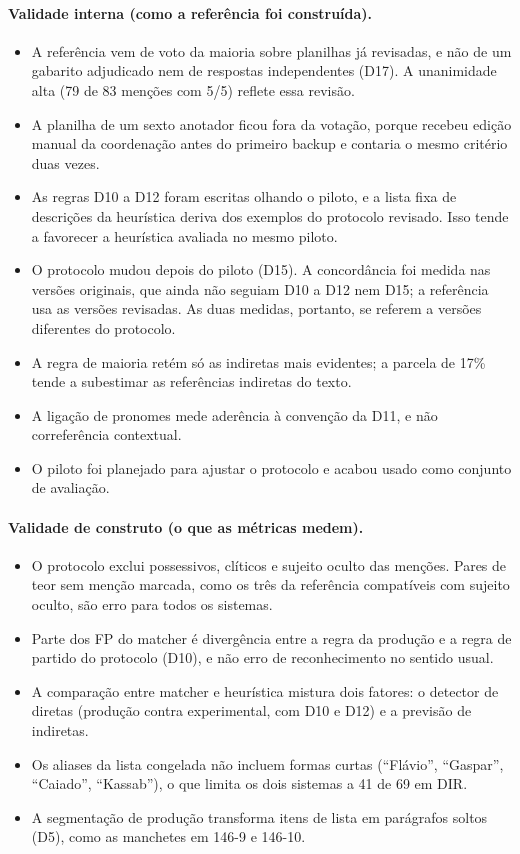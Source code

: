 \documentclass[11pt,a4paper]{article}
\begin{document}
\paragraph{Validade interna (como a referência foi construída).}
\begin{itemize}
\item A referência vem de voto da maioria sobre planilhas já revisadas, e não de um gabarito adjudicado nem de respostas independentes (D17). A unanimidade alta (79 de 83 menções com 5/5) reflete essa revisão.
\item A planilha de um sexto anotador ficou fora da votação, porque recebeu edição manual da coordenação antes do primeiro backup e contaria o mesmo critério duas vezes.
\item As regras D10 a D12 foram escritas olhando o piloto, e a lista fixa de descrições da heurística deriva dos exemplos do protocolo revisado. Isso tende a favorecer a heurística avaliada no mesmo piloto.
\item O protocolo mudou depois do piloto (D15). A concordância foi medida nas versões originais, que ainda não seguiam D10 a D12 nem D15; a referência usa as versões revisadas. As duas medidas, portanto, se referem a versões diferentes do protocolo.
\item A regra de maioria retém só as indiretas mais evidentes; a parcela de 17\% tende a subestimar as referências indiretas do texto.
\item A ligação de pronomes mede aderência à convenção da D11, e não correferência contextual.
\item O piloto foi planejado para ajustar o protocolo e acabou usado como conjunto de avaliação.
\end{itemize}

\paragraph{Validade de construto (o que as métricas medem).}
\begin{itemize}
\item O protocolo exclui possessivos, clíticos e sujeito oculto das menções. Pares de teor sem menção marcada, como os três da referência compatíveis com sujeito oculto, são erro para todos os sistemas.
\item Parte dos FP do matcher é divergência entre a regra da produção e a regra de partido do protocolo (D10), e não erro de reconhecimento no sentido usual.
\item A comparação entre matcher e heurística mistura dois fatores: o detector de diretas (produção contra experimental, com D10 e D12) e a previsão de indiretas.
\item Os aliases da lista congelada não incluem formas curtas (\enquote{Flávio}, \enquote{Gaspar}, \enquote{Caiado}, \enquote{Kassab}), o que limita os dois sistemas a 41 de 69 em DIR.
\item A segmentação de produção transforma itens de lista em parágrafos soltos (D5), como as manchetes em 146-9 e 146-10.
\end{itemize}
\end{document}
